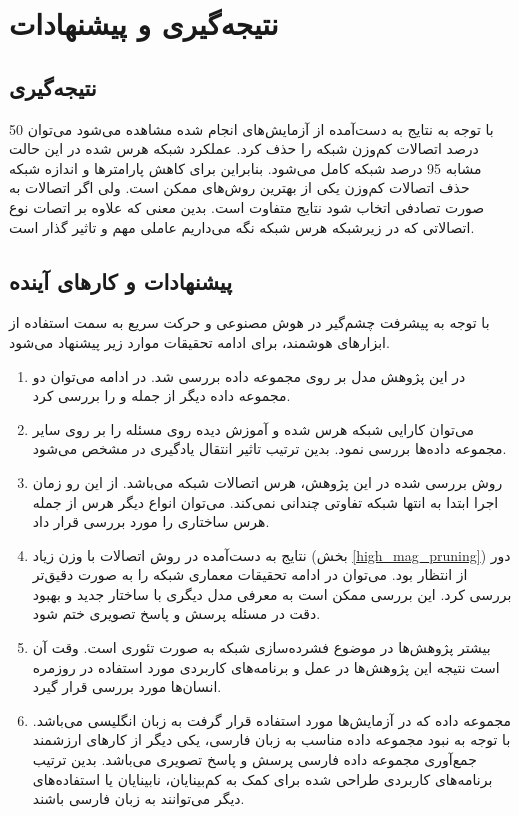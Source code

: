 \chapter{نتیجه‌گیری و پیشنهادات}
\thispagestyle{empty}

\section{نتیجه‌گیری}

با توجه به نتایج به دست‌آمده از آزمایش‌های انجام شده مشاهده می‌شود می‌توان 50 درصد اتصالات کم‌وزن شبکه
را حذف کرد. عملکرد شبکه هرس شده در این حالت مشابه 95 درصد شبکه کامل می‌شود. بنابراین برای کاهش پارامتر‌ها و اندازه شبکه حذف اتصالات کم‌وزن یکی از بهترین روش‌های ممکن است. ولی اگر اتصالات به صورت تصادفی اتخاب شود نتایج متفاوت است. بدین معنی که علاوه بر اتصات نوع اتصالاتی که در زیرشبکه هرس شبکه نگه می‌داریم عاملی مهم و تاثیر گذار است. 

\section{پیشنهادات و کار‌های آینده}
با توجه به پیشرفت چشم‌گیر در هوش مصنوعی و حرکت سریع به سمت استفاده از ابزار‌های هوشمند، برای ادامه تحقیقات موارد زیر پیشنهاد می‌شود.
\begin{enumerate}
	\item در این پژوهش مدل
	بر روی مجموعه داده
	بررسی شد. در ادامه می‌توان دو مجموعه داده دیگر از جمله
	و 
	را بررسی کرد.
	\item
	می‌توان کارایی شبکه هرس شده و آموزش دیده روی مسئله 
	را بر روی سایر مجموعه داده‌ها
	 بررسی نمود. بدین ترتیب تاثیر انتقال یادگیری
	 در 
	مشخص می‌شود.
	\item روش بررسی شده در این پژوهش، هرس اتصالات شبکه می‌باشد. از این رو زمان اجرا ابتدا به انتها شبکه تفاوتی چندانی نمی‌کند. می‌توان انواع دیگر هرس از جمله هرس ساختاری
	را مورد بررسی قرار داد.
	\item
	نتایج به دست‌آمده در روش اتصالات با وزن زیاد (بخش \ref{high_mag_pruning}) دور از انتظار بود. می‌توان در ادامه تحقیقات معماری شبکه
	را به صورت دقیق‌تر بررسی کرد. این بررسی ممکن است به معرفی مدل دیگری با ساختار جدید و بهبود دقت در مسئله پرسش و پاسخ تصویری ختم شود.
	\item بیشتر پژوهش‌ها در موضوع فشرده‌سازی شبکه به صورت تئوری است. وقت آن است  نتیجه این پژوهش‌ها در عمل و برنامه‌های کاربردی
	 مورد استفاده در روزمره انسان‌ها مورد بررسی قرار گیرد. 
	
	\item مجموعه داده
	که در آزمایش‌ها مورد استفاده قرار گرفت به زبان انگلیسی می‌باشد. با توجه به نبود مجموعه داده مناسب به زبان فارسی، یکی دیگر از کار‌های ارزشمند جمع‌آوری مجموعه داده فارسی پرسش و پاسخ تصویری می‌باشد. بدین ترتیب برنامه‌های کاربردی طراحی شده برای کمک به کم‌بینایان، نابینایان یا استفاده‌های دیگر می‌توانند به زبان فارسی باشند.
\end{enumerate}



